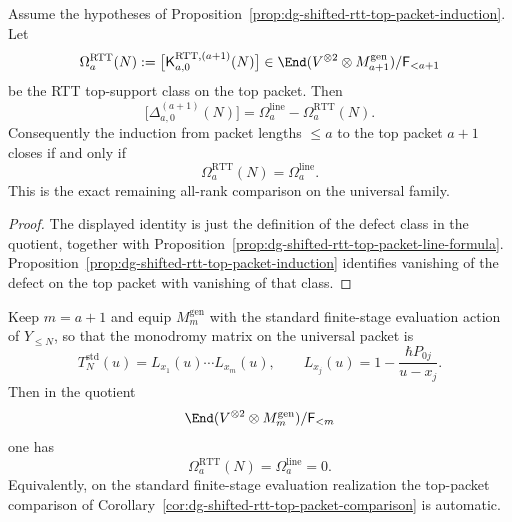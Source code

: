 \begin{corollary}
\label{cor:dg-shifted-rtt-top-packet-comparison}
Assume the hypotheses of
Proposition~\ref{prop:dg-shifted-rtt-top-packet-induction}.  Let
\[
\Omega_a^{\mathrm{RTT}}(N)
:=
\bigl[\mathsf{K}^{\mathrm{RTT},(a+1)}_{a,0}(N)\bigr]
\in
\End(V^{\otimes 2}\otimes M_{a+1}^{\mathrm{gen}})/\mathsf{F}_{<a+1}
\]
be the RTT top-support class on the top packet.  Then
\[
\bigl[\Delta^{(a+1)}_{a,0}(N)\bigr]
=
\Omega_a^{\mathrm{line}}-\Omega_a^{\mathrm{RTT}}(N).
\]
Consequently the induction from packet lengths $\le a$ to the top
packet $a+1$ closes if and only if
\[
\Omega_a^{\mathrm{RTT}}(N)=\Omega_a^{\mathrm{line}}.
\]
This is the exact remaining all-rank comparison on the universal
family.
\end{corollary}

\begin{proof}
The displayed identity is just the definition of the defect class in
the quotient, together with
Proposition~\ref{prop:dg-shifted-rtt-top-packet-line-formula}.
Proposition~\ref{prop:dg-shifted-rtt-top-packet-induction} identifies
vanishing of the defect on the top packet with vanishing of that class.
\end{proof}

\begin{proposition}
\label{prop:dg-shifted-rtt-top-packet-standard-discharge}
Keep $m=a+1$ and equip $M_m^{\mathrm{gen}}$ with the standard
finite-stage evaluation action of $Y_{\le N}$, so that the monodromy
matrix on the universal packet is
\[
T_N^{\mathrm{std}}(u)=L_{x_1}(u)\cdots L_{x_m}(u),
\qquad
L_{x_j}(u)=1-\frac{\hbar P_{0j}}{u-x_j}.
\]
Then in the quotient
\[
\End(V^{\otimes 2}\otimes M_m^{\mathrm{gen}})/\mathsf{F}_{<m}
\]
one has
\[
\Omega_a^{\mathrm{RTT}}(N)=\Omega_a^{\mathrm{line}}=0.
\]
Equivalently, on the standard finite-stage evaluation realization the
top-packet comparison of
Corollary~\ref{cor:dg-shifted-rtt-top-packet-comparison}
is automatic.
\end{proposition}

